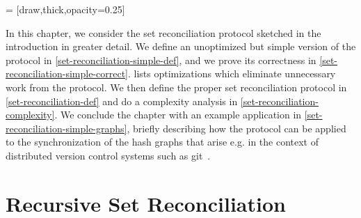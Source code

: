 
\newcommand{\examplefp}[1]{#1}
\newcommand{\fpa}[0]{\examplefp{144}}
\newcommand{\fpb}[0]{\examplefp{194}}
\newcommand{\fpc}[0]{\examplefp{240}}
\newcommand{\fpd}[0]{\examplefp{245}}
\newcommand{\fpe}[0]{\examplefp{76}}
\newcommand{\fpf}[0]{\examplefp{221}}
\newcommand{\fpg}[0]{\examplefp{224}}
\newcommand{\fph}[0]{\examplefp{65}}
\newcommand{\fpcd}[0]{\examplefp{229}}
\newcommand{\fpacd}[0]{\examplefp{117}}
\newcommand{\fpefgh}[0]{\examplefp{74}}
\newcommand{\fpbcdh}[0]{\examplefp{232}}
\newcommand{\fpzero}[0]{\examplefp{0}}

\newcommand{\examplea}[0]{a}
\newcommand{\exampleb}[0]{b}
\newcommand{\examplec}[0]{c}
\newcommand{\exampled}[0]{d}
\newcommand{\examplee}[0]{e}
\newcommand{\examplef}[0]{f}
\newcommand{\exampleg}[0]{g}
\newcommand{\exampleh}[0]{h}
\newcommand{\examplei}[0]{i}

\newcommand{\examplefpi}[3]{
  $\ifpmanual{#1}{#2}{\fp{#3}}$
}
\newcommand{\exampleiis}[3]{
\begin{tabular}{ c | c  | c }
{#1} & {#3} & {#2} \\ 
\end{tabular}
}




 = [draw,thick,opacity=0.25]

In this chapter, we consider the set reconciliation protocol sketched in the introduction in greater detail.
We define an unoptimized but simple version of the protocol in \cref{set-reconciliation-simple-def}, and we prove its correctness in \cref{set-reconciliation-simple-correct}.  lists optimizations which eliminate unnecessary work from the protocol. We then define the proper set reconciliation protocol in \cref{set-reconciliation-def} and  do a complexity analysis in \cref{set-reconciliation-complexity}. We conclude the chapter with an example application in \cref{set-reconciliation-simple-graphs}, briefly describing how the protocol can be applied to the synchronization of the hash graphs that arise e.g. in the context of distributed version control systems such as git~\cite{chacon2014pro}.

\section{Recursive Set Reconciliation}

